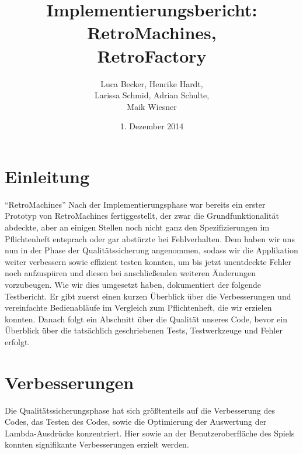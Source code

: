 \documentclass[parskip=full]{scrreprt}
\begin{document}
\title{Implementierungsbericht: RetroMachines, \\ RetroFactory}
\author{Luca Becker, Henrike Hardt,\\Larissa Schmid, Adrian Schulte,\\Maik Wiesner}
\date{1. Dezember 2014}
\maketitle
\thispagestyle{empty}

\clearpage

\thispagestyle{empty}
\tableofcontents
\thispagestyle{empty}

\clearpage
\setcounter{page}{1}

\chapter{Einleitung}

\enquote{RetroMachines}
Nach der Implementierungsphase war bereits ein erster Prototyp von RetroMachines fertiggestellt, der zwar die Grundfunktionalität abdeckte, aber an einigen Stellen noch nicht ganz den Spezifizierungen im Pflichtenheft entsprach oder gar abstürzte bei Fehlverhalten.
Dem haben wir uns nun in der Phase der Qualitätssicherung angenommen, sodass wir die Applikation weiter verbessern sowie effizient testen konnten, um bis jetzt unentdeckte Fehler noch aufzuspüren und diesen bei anschließenden weiteren Änderungen vorzubeugen.
Wie wir dies umgesetzt haben, dokumentiert der folgende Testbericht. Er gibt zuerst einen kurzen Überblick über die Verbesserungen und vereinfachte Bedienabläufe im Vergleich zum Pflichtenheft, die wir erzielen konnten. Danach folgt ein Abschnitt über die Qualität unseres Code, bevor ein Überblick über die tatsächlich geschriebenen Tests, Testwerkzeuge und Fehler erfolgt.

\chapter{Verbesserungen}

Die Qualitätssicherungsphase hat sich größtenteils auf die Verbesserung des Codes, das Testen des Codes, sowie die Optimierung der Auswertung der Lambda-Ausdrücke konzentriert. Hier sowie an der Benutzeroberfläche des Spiels konnten signifikante Verbesserungen erzielt werden. 
\end{document}
